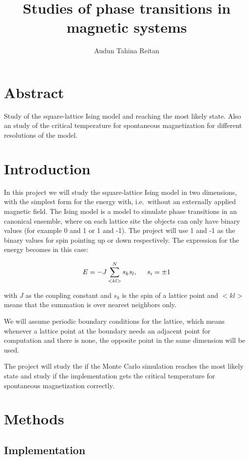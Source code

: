 \documentclass[a4paper, fontsize=11pt]{article}
\author{Audun Tahina Reitan}
\title{Studies of phase transitions in magnetic systems}
\begin{document}
\maketitle

\section{Abstract}
Study of the square-lattice Ising model and reaching the most likely state. Also an study of the critical temperature for spontaneous magnetization for different resolutions of the model.

\section{Introduction}
In this project we will study the square-lattice Ising model in two dimensions, with the simplest form for the energy with, i.e.\ without an externally applied magnetic field. The Ising model is a model to simulate phase transitions in an canonical ensemble, where on each lattice site the objects can only have binary values (for example 0 and 1 or 1 and -1). The project will use 1 and -1 as the binary values for spin pointing up or down respectively. The expression for the energy becomes in this case:

\begin{equation} \label{eq:1}
E = -J \sum_{<kl>}^N s_k s_l, \hspace{5mm} s_i = \pm 1
\end{equation}

\noindent
with $J$ as the coupling constant and $s_k$ is the spin of a lattice point and $<kl>$ means that the summation is over nearest neighbors only.

We will assume periodic boundary conditions for the lattice, which means whenever a lattice point at the boundary needs an adjacent point for computation and there is none, the opposite point in the same dimension will be used.

The project will study the if the Monte Carlo simulation reaches the most likely state and study if the implementation gets the critical temperature for spontaneous magnetization correctly.

\section{Methods} \label{mathrefs}
\subsection{Implementation}
\end{document}
